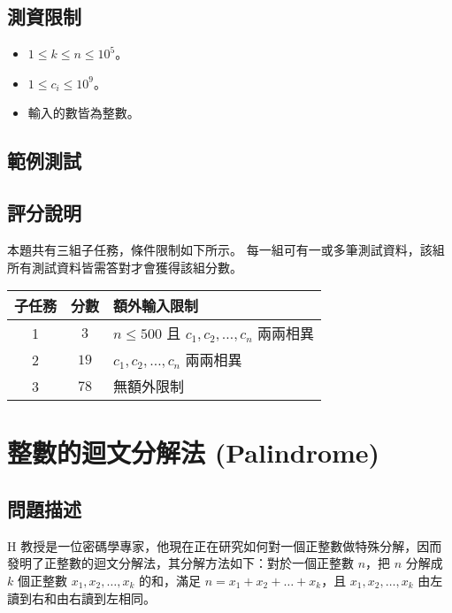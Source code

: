 \subsection{測資限制}

\begin{itemize}
\tightlist
\item
  \(1 \le k \le n \le 10^5\)。
\item
  \(1 \le c_i\le 10^{9}\)。
\item
  輸入的數皆為整數。
\end{itemize}

\subsection{範例測試}

\begin{example}
%
%
\end{example}

\subsection{評分說明}

本題共有三組子任務，條件限制如下所示。
每一組可有一或多筆測試資料，該組所有測試資料皆需答對才會獲得該組分數。

\begin{longtable}[]{@{}ccl@{}}
\toprule
子任務 & 分數 & 額外輸入限制 \\
\midrule
\endhead
1 & \(3\) & \(n \le 500\) 且 \(c_1, c_2, \ldots, c_n\) 兩兩相異 \\
2 & \(19\) & \(c_1, c_2, \ldots, c_n\) 兩兩相異 \\
3 & \(78\) & 無額外限制 \\
\bottomrule
\end{longtable}

\section{整數的迴文分解法 (Palindrome)}

\subsection{問題描述}

H
教授是一位密碼學專家，他現在正在研究如何對一個正整數做特殊分解，因而發明了正整數的迴文分解法，其分解方法如下：對於一個正整數
\(n\)，把 \(n\) 分解成 \(k\) 個正整數 \(x_1, x_2, \ldots, x_k\)
的和，滿足 \(n = x_1 + x_2 + \ldots + x_k\)，且
\(x_1, x_2, \ldots, x_k\) 由左讀到右和由右讀到左相同。

